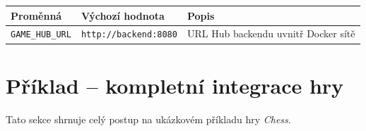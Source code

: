\documentclass[12pt,a4paper]{article}
\begin{document}
\begin{center}
\begin{tabular}{@{}lll@{}}
\toprule
\textbf{Proměnná} & \textbf{Výchozí hodnota} & \textbf{Popis} \\
\midrule
\texttt{GAME\_HUB\_URL} & \texttt{http://backend:8080} & URL Hub backendu uvnitř Docker sítě \\
\bottomrule
\end{tabular}
\end{center}

\clearpage
\section{Příklad -- kompletní integrace hry}

Tato sekce shrnuje celý postup na ukázkovém příkladu hry \textit{Chess}.
\end{document}
